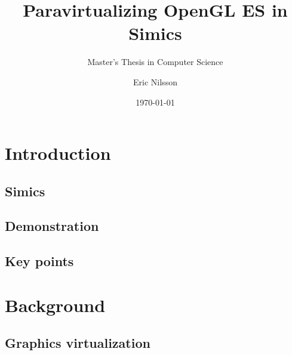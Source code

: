 \documentclass{beamer}
\title{Paravirtualizing OpenGL ES in Simics}
\subtitle{Master's Thesis in Computer Science}
\author{Eric Nilsson}
\institute{Blekinge Institute of Technology}
\date{\today} %
\begin{document}
	
	
	\section{Introduction}
	\subsection{Simics}
	
	\subsection{Demonstration}
	
	\subsection{Key points}
	

	\section{Background}
	\subsection{Graphics virtualization}
	

	
\end{document}
